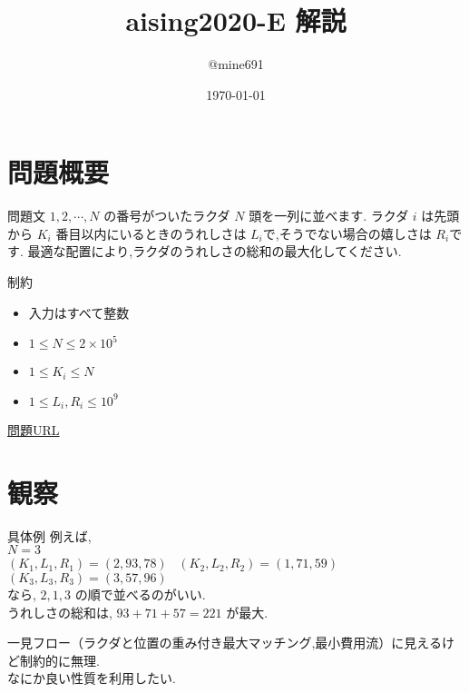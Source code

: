 \documentclass[dvipdfmx,12pt]{beamer}%
\title{aising2020-E 解説}
\author{@mine691}
\date{\today}
\begin{document}
\maketitle
%

\section{問題概要}
\begin{frame} %
\begin{block}{問題文}
$ 1, 2, \cdots , N$ の番号がついたラクダ $ N $ 頭を一列に並べます.
ラクダ $ i $ は先頭から $ K_i $ 番目以内にいるときのうれしさは $ L_i $で,そうでない場合の嬉しさは $ R_i $です.
最適な配置により,ラクダのうれしさの総和の最大化してください.
\end{block}

\begin{exampleblock}{制約}

	\begin{itemize}
		\item 入力はすべて整数
		\item $1 \leq N \leq 2 \times 10 ^ {5}$
		\item $1 \leq K_i \leq N$
		\item $1 \leq L_i, R_i \leq 10 ^ {9}$
	\end{itemize}

\end{exampleblock}
\href{https://atcoder.jp/contests/aising2020/tasks/aising2020_e}{問題URL}
\end{frame}

\section{観察}

\begin{frame}
\begin{exampleblock}{具体例}
	例えば,\\
	$ N = 3 $ \\
	$ (K_1, L_1, R_1) = (2, 93, 78) $ \ $ (K_2, L_2, R_2) = (1, 71, 59) $ \\
	$ (K_3, L_3, R_3) = (3, 57, 96) $ \\
	なら, $2, 1, 3$ の順で並べるのがいい.\\
	うれしさの総和は, $ 93 + 71 + 57 = 221 $ が最大.
\end{exampleblock}
一見フロー（ラクダと位置の重み付き最大マッチング,最小費用流）に見えるけど制約的に無理.\\
なにか良い性質を利用したい.
\end{frame}
\end{document}
